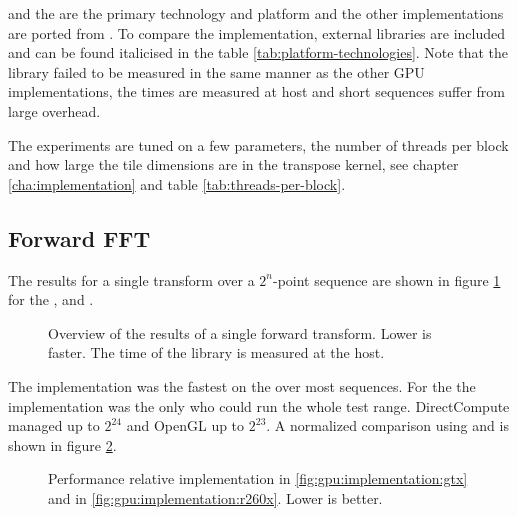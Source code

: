 {\CU} and the {\NVCARD} are the primary technology and platform and the other implementations are ported from {\CU}. To compare the implementation, external libraries are included and can be found italicised in the table \ref{tab:platform-technologies}. Note that the {\CLFFT} library failed to be measured in the same manner as the other GPU implementations, the times are measured at host and short sequences suffer from large overhead.

The experiments are tuned on a few parameters, the number of threads per block and how large the tile dimensions are in the transpose kernel, see chapter \ref{cha:implementation} and table \ref{tab:threads-per-block}.

\subsection{Forward FFT}

The results for a single transform over a $2^{n}$-point sequence are shown in figure \ref{fig:gpu:overview} for the {\NVCARD}, {\AMDCARD} and {\INTELCPU}.

\begin{figure}[!htbp]
	\centering
	\subfloat[\NVCARD]{	
		
	}
	\vfill
	\subfloat[\AMDCARD]{
		
	}
	\caption{Overview of the results of a single forward transform. Lower is faster. The time of the {\CLFFT} library is measured at the host.}
	\label{fig:gpu:overview}
\end{figure}

The {\CU} implementation was the fastest on the {\NVCARD} over most sequences. For the {\AMDCARD} the {\OCL} implementation was the only who could run the whole test range. DirectCompute managed up to $2^{24}$ and OpenGL up to $2^{23}$. A normalized comparison using {\CU} and {\OCL} is shown in figure \ref{fig:gpu:implementation}.

\begin{figure}[!htbp]
	\centering
	\subfloat[\NVCARD\label{fig:gpu:implementation:gtx}]{	
		
	}
	\vfill
	\subfloat[\AMDCARD\label{fig:gpu:implementation:r260x}]{
		
	}	
	\caption{Performance relative {\CU} implementation in \ref{fig:gpu:implementation:gtx} and {\OCL} in \ref{fig:gpu:implementation:r260x}. Lower is better.}
	\label{fig:gpu:implementation}
\end{figure}


